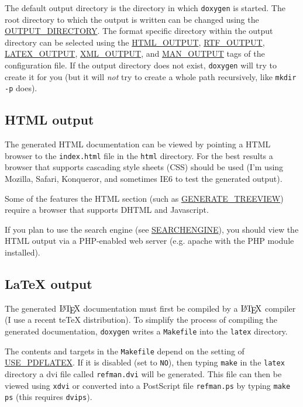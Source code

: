 The default output directory is the directory in which {\tt doxygen} is started. The root directory to which the output is written can be changed using the \hyperlink{config_cfg_output_directory}{OUTPUT\_\-DIRECTORY}. The format specific directory within the output directory can be selected using the \hyperlink{config_cfg_html_output}{HTML\_\-OUTPUT}, \hyperlink{config_cfg_rtf_output}{RTF\_\-OUTPUT}, \hyperlink{config_cfg_latex_output}{LATEX\_\-OUTPUT}, \hyperlink{config_cfg_xml_output}{XML\_\-OUTPUT}, and \hyperlink{config_cfg_man_output}{MAN\_\-OUTPUT} tags of the configuration file. If the output directory does not exist, {\tt doxygen} will try to create it for you (but it will {\em not\/} try to create a whole path recursively, like {\tt mkdir -p} does).\hypertarget{starting_html_out}{}\subsection{HTML output}\label{starting_html_out}
 The generated HTML documentation can be viewed by pointing a HTML browser to the {\tt index.html} file in the {\tt html} directory. For the best results a browser that supports cascading style sheets (CSS) should be used (I'm using Mozilla, Safari, Konqueror, and sometimes IE6 to test the generated output).

Some of the features the HTML section (such as \hyperlink{config_cfg_generate_treeview}{GENERATE\_\-TREEVIEW}) require a browser that supports DHTML and Javascript.

If you plan to use the search engine (see \hyperlink{config_cfg_searchengine}{SEARCHENGINE}), you should view the HTML output via a PHP-enabled web server (e.g. apache with the PHP module installed).\hypertarget{starting_latex_out}{}\subsection{LaTeX output}\label{starting_latex_out}
 The generated $\mbox{\LaTeX}$ documentation must first be compiled by a $\mbox{\LaTeX}$ compiler (I use a recent teTeX distribution). To simplify the process of compiling the generated documentation, {\tt doxygen} writes a {\tt Makefile} into the {\tt latex} directory.

The contents and targets in the {\tt Makefile} depend on the setting of \hyperlink{config_cfg_use_pdflatex}{USE\_\-PDFLATEX}. If it is disabled (set to {\tt NO}), then typing {\tt make} in the {\tt latex} directory a dvi file called {\tt refman.dvi} will be generated. This file can then be viewed using {\tt xdvi} or converted into a PostScript file {\tt refman.ps} by typing {\tt make ps} (this requires {\tt dvips}).

